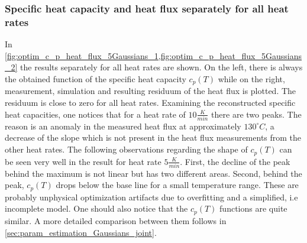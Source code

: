 \documentclass{scrartcl}[12pt, halfparskip]
\numberwithin{equation}{section}
\numberwithin{figure}{section}
\numberwithin{table}{section}
\begin{document}
\subsubsection{Specific heat capacity and heat flux separately for all heat rates}
\label{sec:param_estimation_5Gaussians_c_p_heat_flux_seperately}

In \cref{fig:optim_c_p_heat_flux_5Gaussians_1,fig:optim_c_p_heat_flux_5Gaussians_2} the results separately for all heat rates are shown. On the left, there is always the obtained function of the specific heat capacity $c_p(T)$ while on the right, measurement, simulation and resulting residuum of the heat flux is plotted. 
The residuum is close to zero for all heat rates. Examining the reconstructed specific heat capacities, one notices that for a heat rate of $10 \frac{K}{min}$ there are two peaks. 
The reason is an anomaly in the measured heat flux at approximately $130^{\circ} C$, a decrease of the slope which is not present in the heat flux measurements from the other heat rates. 
The following observations regarding the shape of $c_p(T)$ can be seen very well in the result for heat rate $5 \frac{K}{min}$. 
First, the decline of the peak behind the maximum is not linear but has two different areas. 
Second, behind the peak, $c_p(T)$ drops below the base line for a small temperature range. 
These are probably unphysical optimization artifacts due to overfitting and a simplified, i.e incomplete model. 
One should also notice that the $c_p(T)$ functions are quite similar.
A more detailed comparison between them follows in \cref{sec:param_estimation_Gaussians_joint}.
\end{document}
